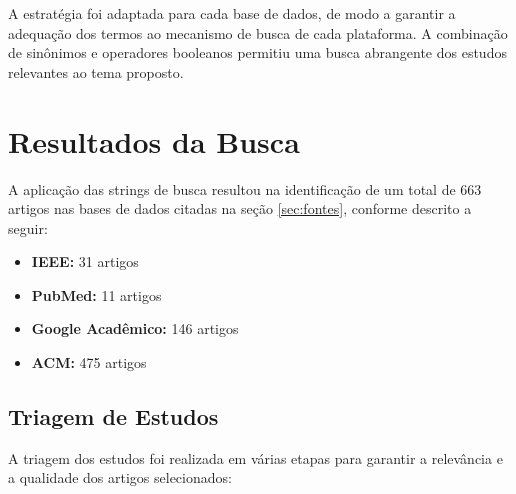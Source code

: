 \documentclass[conference]{IEEEtran}
\begin{document}
A estratégia foi adaptada para cada base de dados, de modo a garantir a adequação dos termos ao mecanismo de busca de cada plataforma. A combinação de sinônimos e operadores booleanos permitiu uma busca abrangente dos estudos relevantes ao tema proposto.

\section{Resultados da Busca}
\label{sec:resultados}
A aplicação das strings de busca resultou na identificação de um total de 663 artigos nas bases de dados citadas na seção \ref{sec:fontes}, conforme descrito a seguir:

\begin{itemize}
    \item \textbf{IEEE:} 31 artigos
    \item \textbf{PubMed:} 11 artigos
    \item \textbf{Google Acadêmico:} 146 artigos
    \item \textbf{ACM:} 475 artigos \newline
\end{itemize}


\subsection{Triagem de Estudos}

A triagem dos estudos foi realizada em várias etapas para garantir a relevância e a qualidade dos artigos selecionados:
\end{document}
